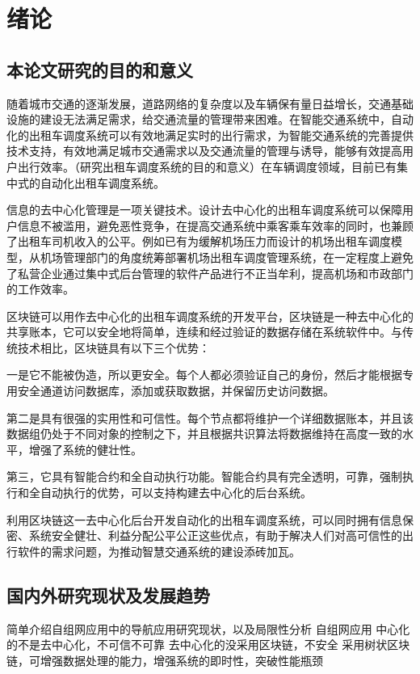\chapter{绪论}
\section{本论文研究的目的和意义}

随着城市交通的逐渐发展，道路网络的复杂度以及车辆保有量日益增长，交通基础设施的建设无法满足需求，给交通流量的管理带来困难。在智能交通系统中，自动化的出租车调度系统可以有效地满足实时的出行需求，为智能交通系统的完善提供技术支持，有效地满足城市交通需求以及交通流量的管理与诱导，能够有效提高用户出行效率。（研究出租车调度系统的目的和意义）在车辆调度领域，目前已有集中式的自动化出租车调度系统。\par
信息的去中心化管理是一项关键技术。设计去中心化的出租车调度系统可以保障用户信息不被滥用，避免恶性竞争，在提高交通系统中乘客乘车效率的同时，也兼顾了出租车司机收入的公平。例如已有为缓解机场压力而设计的机场出租车调度模型，从机场管理部门的角度统筹部署机场出租车调度管理系统，在一定程度上避免了私营企业通过集中式后台管理的软件产品进行不正当牟利，提高机场和市政部门的工作效率。\par
区块链可以用作去中心化的出租车调度系统的开发平台，区块链是一种去中心化的共享账本，它可以安全地将简单，连续和经过验证的数据存储在系统软件中。与传统技术相比，区块链具有以下三个优势：\par
一是它不能被伪造，所以更安全。每个人都必须验证自己的身份，然后才能根据专用安全通道访问数据库，添加或获取数据，并保留历史访问数据。\par
第二是具有很强的实用性和可信性。每个节点都将维护一个详细数据账本，并且该数据组仍处于不同对象的控制之下，并且根据共识算法将数据维持在高度一致的水平，增强了系统的健壮性。\par
第三，它具有智能合约和全自动执行功能。智能合约具有完全透明，可靠，强制执行和全自动执行的优势，可以支持构建去中心化的后台系统。\par
利用区块链这一去中心化后台开发自动化的出租车调度系统，可以同时拥有信息保密、系统安全健壮、利益分配公平公正这些优点，有助于解决人们对高可信性的出行软件的需求问题，为推动智慧交通系统的建设添砖加瓦。


\section{国内外研究现状及发展趋势}
简单介绍自组网应用中的导航应用研究现状，以及局限性分析
自组网应用
中心化的不是去中心化，不可信不可靠
去中心化的没采用区块链，不安全
采用树状区块链，可增强数据处理的能力，增强系统的即时性，突破性能瓶颈

